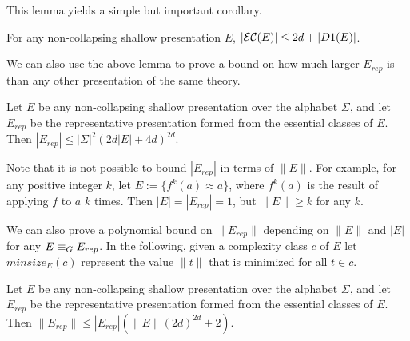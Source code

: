 This lemma yields a simple but important corollary.

\begin{corollary}
For any non-collapsing shallow presentation $E$, $|{\mathcal{E}\mathcal{C}}(E)| \le 2d + |D1(E)|$.
\end{corollary}

We can also use the above lemma to prove a bound on how much larger $E_{rep}$ is than any other presentation of the same theory.

\begin{theorem}
\label{eqs_bound}
Let $E$ be any non-collapsing shallow presentation over the alphabet $\Sigma$, and let $E_{rep}$ be the representative presentation formed from the essential classes of $E$. 
Then $|E_{rep}| \le |\Sigma|^2(2d |E| + 4d)^{2d}$. 
\end{theorem}

Note that it is not possible to bound $|E_{rep}|$ in terms of $\|E\|$.
For example, for any positive integer $k$, let $E := \{ f^k(a) \approx a \}$, where $f^k(a)$ is the result of applying $f$ to $a$ $k$ times.
Then $|E| = |E_{rep}| = 1$, but $\|E\| \ge k$ for any $k$.

We can also prove a polynomial bound on $\|E_{rep}\|$ depending on $\|E\|$ and $|E|$ for any $E \equiv_G E_{rep}$.
In the following, given a complexity class $c$ of $E$ let $minsize_E(c)$ represent the value $\|t\|$ that is minimized for all $t \in c$.


\begin{theorem}
\label{size_bound}
Let $E$ be any non-collapsing shallow presentation over the alphabet $\Sigma$, and let $E_{rep}$ be the representative presentation formed from the essential classes of $E$. 
Then $\|E_{rep}\| \le |E_{rep}|(\|E\|(2d)^{2d}+2)$. 
\end{theorem}
